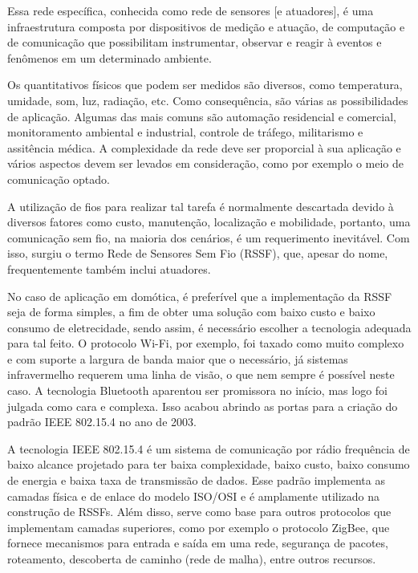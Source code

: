 \documentclass[
    12pt,               %
    a4paper,            %
    english,            %
    brazil,             %
    ]{article}
\begin{document}
Essa rede específica, conhecida como rede de sensores [e atuadores], é uma infraestrutura composta por dispositivos de medição e atuação, de computação e de comunicação que possibilitam
instrumentar, observar e reagir à eventos e fenômenos em um determinado ambiente. \cite{sohraby_minoli_znati2007}

Os quantitativos físicos que podem ser medidos são diversos, como temperatura, umidade, som, luz, radiação, etc. Como consequência, são várias as possibilidades de aplicação. Algumas das mais comuns são automação residencial
e comercial, monitoramento ambiental e industrial, controle de tráfego, militarismo e assitência médica. A complexidade da rede deve ser proporcial à sua aplicação e vários aspectos devem ser levados em consideração,
como por exemplo o meio de comunicação optado. \cite{kuorilehto2007}

A utilização de fios para realizar tal tarefa é normalmente descartada devido à diversos fatores como custo, manutenção, localização e mobilidade, portanto, uma comunicação sem fio, na maioria dos cenários,
é um requerimento inevitável. Com isso, surgiu o termo Rede de Sensores Sem Fio (RSSF), que, apesar do nome, frequentemente também inclui atuadores. \cite{karl_willig2005}

No caso de aplicação em domótica, é preferível que a implementação da RSSF seja de forma simples, a fim de obter uma solução com baixo custo e baixo consumo de eletrecidade, sendo assim, é necessário escolher a tecnologia
adequada para tal feito. O protocolo Wi-Fi, por exemplo, foi taxado como muito complexo e com suporte a largura de banda maior que o necessário, já sistemas infravermelho requerem uma linha de visão, o que nem sempre é
possível neste caso. A tecnologia Bluetooth aparentou ser promissora no início, mas logo foi julgada como cara e complexa. Isso acabou abrindo as portas para a criação do padrão IEEE 802.15.4 no ano de 2003.
\cite{sohraby_minoli_znati2007}

A tecnologia IEEE 802.15.4 é um sistema de comunicação por rádio frequência de baixo alcance projetado para ter baixa complexidade, baixo custo, baixo consumo de energia e baixa taxa de transmissão de dados. Esse padrão implementa as
camadas física e de enlace do modelo ISO/OSI e é amplamente utilizado na construção de RSSFs. Além disso, serve como base para outros protocolos que implementam camadas superiores, como por exemplo o protocolo ZigBee,
que fornece mecanismos para entrada e saída em uma rede, segurança de pacotes, roteamento, descoberta de caminho (rede de malha), entre outros recursos. \cite{buratti2011}
\end{document}

